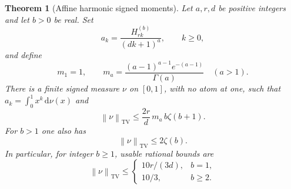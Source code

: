 \documentclass[11pt,letterpaper]{article}
\numberwithin{equation}{section}
\newtheorem{theorem}{Theorem}[section]
\theoremstyle{definition}
\DeclareMathOperator{\TV}{TV}
\newcommand{\dd}{\,\mathrm d}
\newcommand{\norm}[1]{\left\lVert#1\right\rVert}
\begin{document}
\begin{theorem}[Affine harmonic signed moments]\label{thm:affine}
Let $a,r,d$ be positive integers and let $b>0$ be real. Set
\begin{equation}
 a_k=\frac{H_{rk}^{(b)}}{(dk+1)^a},\qquad k\ge0,
 \label{eq:affineseq}
\end{equation}
and define
\begin{equation}
 m_1=1,\qquad
 m_a=\frac{(a-1)^{a-1}e^{-(a-1)}}{\Gamma(a)}\quad(a>1).
 \label{eq:ma}
\end{equation}
There is a finite signed measure $\nu$ on $[0,1]$, with no atom at one,
such that $a_k=\int_0^1x^k\dd\nu(x)$ and
\begin{equation}
 \norm\nu_{\TV}\le\frac{2r}{d}\,m_a\,b\zeta(b+1).
 \label{eq:TVsharp}
\end{equation}
For $b>1$ one also has
\begin{equation}
 \norm\nu_{\TV}\le2\zeta(b).
 \label{eq:TVb}
\end{equation}
In particular, for integer $b\ge1$, usable rational bounds are
\begin{equation}
 \norm\nu_{\TV}\le
 \begin{cases}
 10r/(3d),&b=1,\\
 10/3,&b\ge2.
 \end{cases}
 \label{eq:TVcoarse}
\end{equation}
\end{theorem}
\end{document}
